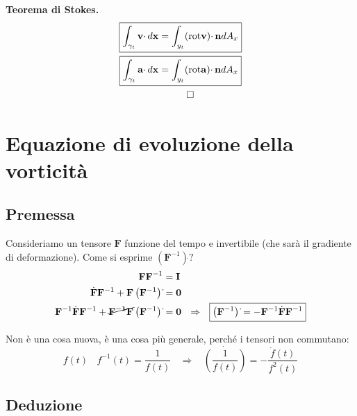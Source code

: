 \documentclass[10pt,a4paper,twoside]{book}
\begin{document}
\textbf{Teorema di Stokes.}
\begin{gather*}
\boxed{\int _{\gamma _{t}}\mathbf{v} \cdotp d\mathbf{x} =\int _{y_{t}}(\mathrm{rot}\mathbf{v}) \cdotp \mathbf{n} dA_{x}}\\
\boxed{\int _{\gamma _{t}}\mathbf{a} \cdotp d\mathbf{x} =\int _{y_{t}}(\mathrm{rot}\mathbf{a}) \cdotp \mathbf{n} dA_{x}}\\
\qed 
\end{gather*}
\section{Equazione di evoluzione della vorticità}
\subsection{Premessa}

Consideriamo un tensore $\mathbf{F}$ funzione del tempo e invertibile (che sarà il gradiente di deformazione). Come si esprime $\left(\mathbf{F}^{-1}\right)\dot{}$$?$
\begin{equation*}
\begin{aligned}
\mathbf{FF}^{-1} & =\mathbf{I}\\
\dot{\mathbf{F}}\mathbf{F}^{-1} +\mathbf{F}\left(\mathbf{F}^{-1}\right)\dot{} & =\mathbf{0}\\
\mathbf{F}^{-1}\dot{\mathbf{F}}\mathbf{F}^{-1} +\cancel{\mathbf{F^{-1} F}}\left(\mathbf{F}^{-1}\right)\dot{} & =\mathbf{0} \ \ \Rightarrow \ \ \boxed{\left(\mathbf{F}^{-1}\right)\dot{} =-\mathbf{F}^{-1}\dot{\mathbf{F}}\mathbf{F}^{-1}}
\end{aligned}
\end{equation*}
\begin{oss}
Non è una cosa nuova, è una cosa più generale, perché i tensori non commutano:
\begin{equation*}
f( t) \ \ \ \ f^{-1}( t) =\frac{1}{f( t)} \ \ \ \ \Rightarrow \ \ \ \ \dot{\left(\frac{1}{f( t)}\right)} =-\frac{\dot{f}( t)}{f^{2}( t)}
\end{equation*}
\end{oss}
\subsection{Deduzione}
\end{document}

